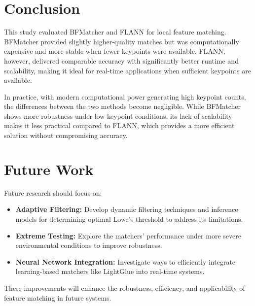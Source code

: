 \section*{Conclusion} 
This study evaluated BFMatcher and FLANN for local feature matching. BFMatcher provided slightly higher-quality matches but was computationally expensive and more stable when fewer keypoints were available. FLANN, however, delivered comparable accuracy with significantly better runtime and scalability, making it ideal for real-time applications when sufficient keypoints are available.

In practice, with modern computational power generating high keypoint counts, the differences between the two methods become negligible. While BFMatcher shows more robustness under low-keypoint conditions, its lack of scalability makes it less practical compared to FLANN, which provides a more efficient solution without compromising accuracy.


\section*{Future Work} 
Future research should focus on: 
\begin{itemize} 
    \item \textbf{Adaptive Filtering:} Develop dynamic filtering techniques and inference models for determining optimal Lowe's threshold to address its limitations.  
    \item \textbf{Extreme Testing:} Explore the matchers' performance under more severe environmental conditions to improve robustness.  
    \item \textbf{Neural Network Integration:} Investigate ways to efficiently integrate learning-based matchers like LightGlue into real-time systems.
\end{itemize}

These improvements will enhance the robustness, efficiency, and applicability of feature matching in future systems.


\newpage